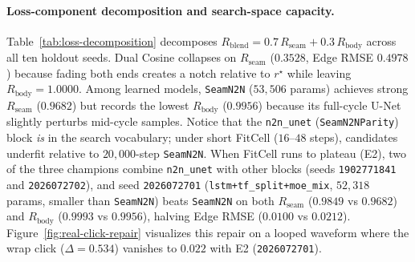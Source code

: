 \paragraph{Loss-component decomposition and search-space capacity.}
Table~\ref{tab:loss-decomposition} decomposes $R_{\mathrm{blend}}{=}0.7\,R_{\mathrm{seam}}{+}0.3\,R_{\mathrm{body}}$ across all ten holdout seeds.
Dual Cosine collapses on $R_{\mathrm{seam}}$ ($0.3528$, Edge RMSE $0.4978$) because fading both ends creates a notch relative to $r^{\star}$ while leaving $R_{\mathrm{body}}{=}1.0000$.
Among learned models, \texttt{SeamN2N} ($53{,}506$ params) achieves strong $R_{\mathrm{seam}}$ ($0.9682$) but records the lowest $R_{\mathrm{body}}$ ($0.9956$) because its full-cycle U-Net slightly perturbs mid-cycle samples.
Notice that the \texttt{n2n\_unet} (\texttt{SeamN2NParity}) block \emph{is} in the search vocabulary; under short FitCell ($16$--$48$ steps), candidates underfit relative to $20{,}000$-step \texttt{SeamN2N}.
When FitCell runs to plateau (E2), two of the three champions combine \texttt{n2n\_unet} with other blocks (seeds \texttt{1902771841} and \texttt{2026072702}), and seed \texttt{2026072701} (\texttt{lstm+tf\_split+moe\_mix}, $52{,}318$ params, smaller than \texttt{SeamN2N}) beats \texttt{SeamN2N} on both $R_{\mathrm{seam}}$ ($0.9849$ vs $0.9682$) and $R_{\mathrm{body}}$ ($0.9993$ vs $0.9956$), halving Edge RMSE ($0.0100$ vs $0.0212$).
Figure~\ref{fig:real-click-repair} visualizes this repair on a looped waveform where the wrap click ($\Delta{=}0.534$) vanishes to $0.022$ with E2 (\texttt{2026072701}).

